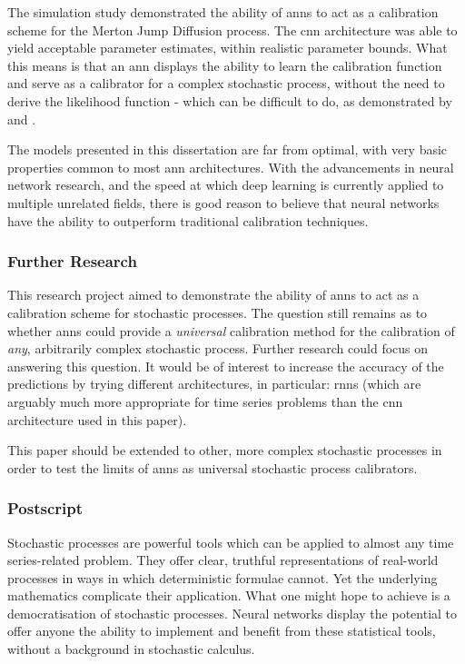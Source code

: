 \documentclass[11pt,oneside,openany,a4paper,english, report, goldenblock
]{usthesis}
\begin{document}
The simulation study demonstrated the ability of \acrshort{ann}s to act as a calibration scheme for the Merton Jump Diffusion process. The \acrshort{cnn} architecture was able to yield acceptable parameter estimates, within realistic parameter bounds. What this means is that an \acrshort{ann} displays the ability to learn the calibration function and serve as a calibrator for a complex stochastic process, without the need to derive the likelihood function - which can be difficult to do, as demonstrated by \citet{Honore} and \citet{Mongwe}.

The models presented in this dissertation are far from optimal, with very basic properties common to most \acrshort{ann} architectures. With the advancements in neural network research, and the speed at which deep learning is currently applied to multiple unrelated fields, there is good reason to believe that neural networks have the ability to outperform traditional calibration techniques. 

\subsubsection{Further Research}
This research project aimed to demonstrate the ability of \acrshort{ann}s to act as a calibration scheme for stochastic processes. The question still remains as to whether \acrshort{ann}s could provide a \textit{universal} calibration method for the calibration of \textit{any}, arbitrarily complex stochastic process. Further research could focus on answering this question. It would be of interest to increase the accuracy of the predictions by trying different architectures, in particular: \acrshort{rnn}s (which are arguably much more appropriate for time series problems than the \acrshort{cnn} architecture used in this paper).

This paper should be extended to other, more complex stochastic processes in order to test the limits of \acrshort{ann}s as universal stochastic process calibrators. 

\subsubsection{Postscript}

Stochastic processes are powerful tools which can be applied to almost any time series-related problem. They offer clear, truthful representations of real-world processes in ways in which deterministic formulae cannot. Yet the underlying mathematics complicate their application. What one might hope to achieve is a democratisation of stochastic processes. Neural networks display the potential to offer anyone the ability to implement and benefit from these statistical tools, without a background in stochastic calculus.
\end{document}
